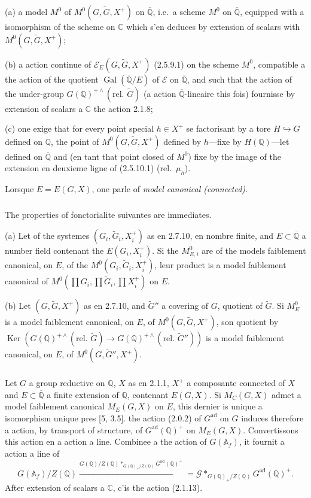 \documentclass[12pt,a4paper]{article}
\theoremstyle{plain}
\theoremstyle{definition}
\theoremstyle{remark}
\DeclareMathOperator{\Gal}{Gal}
\DeclareMathOperator{\Ker}{Ker}
\newcommand{\QQ}{\mathbb{Q}}
\newcommand{\CC}{\mathbb{C}}
\newcommand{\Af}{\mathbb{A}_f}
\begin{document}
(a) a model $M^0$ of $M^0(G,\tilde{G},X^+)$ on $\overline{\QQ}$, i.e.~a scheme $M^0$ on $\overline{\QQ}$, equipped with a isomorphism of the scheme on $\CC$ which s'en deduces by extension of scalars with $M^0(G,\tilde{G},X^+)$;

(b) a action continue of $\mathscr{E}_E(G,\tilde{G},X^+)$ (2.5.9.1) on the scheme $M^0$, compatible a the action of the quotient $\Gal(\overline{\QQ}/E)$ of $\mathscr{E}$ on $\overline{\QQ}$, and such that the action of the under-group $G(\QQ)^{+\wedge}(\text{rel.~}\tilde{G})$ (a action $\overline{\QQ}$-lineaire this fois) fournisse by extension of scalars a $\CC$ the action 2.1.8;

(c) one exige that for every point special $h \in X^+$ se factorisant by a tore $H \hookrightarrow G$ defined on $\QQ$, the point of $M^0(G,\tilde{G},X^+)$ defined by $h$---fixe by $H(\QQ)$---let defined on $\overline{\QQ}$ and (en tant that point closed of $M^0$) fixe by the image of the extension en deuxieme ligne of (2.5.10.1) (rel.~$\mu_h$).

Lorsque $E = E(G,X)$, one parle of \textit{model canonical (connected)}.

\subsubsection{}

The properties of fonctorialite suivantes are immediates.

(a) Let of the systemes $(G_i, \tilde{G}_i, X_i^+)$ as en 2.7.10, en nombre finite, and $E \subset \overline{\QQ}$ a number field contenant the $E(G_i, X_i^+)$. Si the $M^0_{E,i}$ are of the models faiblement canonical, on $E$, of the $M^0(G_i, \tilde{G}_i, X_i^+)$, leur product is a model faiblement canonical of $M^0(\prod G_i, \prod \tilde{G}_i, \prod X_i^+)$ on $E$.

(b) Let $(G, \tilde{G}, X^+)$ as en 2.7.10, and $\tilde{G}''$ a covering of $G$, quotient of $\tilde{G}$. Si $M^0_E$ is a model faiblement canonical, on $E$, of $M^0(G, \tilde{G}, X^+)$, son quotient by $\Ker(G(\QQ)^{+\wedge}(\text{rel.~}\tilde{G}) \to G(\QQ)^{+\wedge}(\text{rel.~}\tilde{G}''))$ is a model faiblement canonical, on $E$, of $M^0(G, \tilde{G}'', X^+)$.

\subsubsection{}

Let $G$ a group reductive on $\QQ$, $X$ as en 2.1.1, $X^+$ a composante connected of $X$ and $E \subset \overline{\QQ}$ a finite extension of $\QQ$, contenant $E(G,X)$. Si $M_C(G,X)$ admet a model faiblement canonical $M_E(G,X)$ on $E$, this dernier is unique a isomorphism unique pres [5, 3.5]. the action (2.0.2) of $G^{\text{ad}}$ on $G$ induces therefore a action, by transport of structure, of $G^{\text{ad}}(\QQ)^+$ on $M_E(G,X)$. Convertissons this action en a action a line. Combinee a the action of $G(\Af)$, it fournit a action a line of
\[
G(\Af)/Z(\QQ) \xrightarrow{G(\QQ)/Z(\QQ) *_{G(\QQ)_+/Z(\QQ)} G^{\text{ad}}(\QQ)^+} = \mathscr{G} *_{G(\QQ)_+/Z(\QQ)} G^{\text{ad}}(\QQ)^+.
\]
After extension of scalars a $\CC$, c'is the action (2.1.13).
\end{document}
